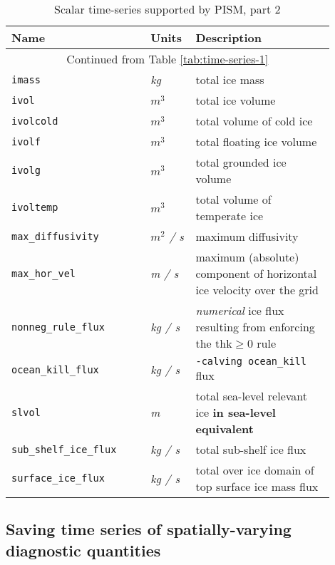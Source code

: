 \begin{table}[ht]
  \centering
 \begin{tabular}{p{0.4\linewidth}p{0.1\linewidth}p{0.4\linewidth}}
    \toprule
    \textbf{Name} & \textbf{Units} & \textbf{Description}\\
    \midrule
    \multicolumn{3}{c}{Continued from Table \ref{tab:time-series-1}}\\
    \texttt{imass} & \textsl{kg} &  total ice mass \\
    \texttt{ivol} & \textsl{$m^{3}$} &  total ice volume \\
    \texttt{ivolcold} & \textsl{$m^{3}$} &  total volume of cold ice \\
    \texttt{ivolf} & \textsl{$m^{3}$} &  total floating ice volume \\
    \texttt{ivolg} & \textsl{$m^{3}$} &  total grounded ice volume \\
    \texttt{ivoltemp} & \textsl{$m^{3}$} &  total volume of temperate ice \\
    \texttt{max_diffusivity} & \textsl{$m^{2}$  / s} &  maximum diffusivity \\
    \texttt{max_hor_vel} & \textsl{m  / s} &  maximum (absolute) component of horizontal ice velocity over the grid \\
    \texttt{nonneg_rule_flux} & \textsl{kg  / s} &  \emph{numerical} ice flux resulting from enforcing the $\mathrm{thk} \ge 0$ rule \\
    \texttt{ocean_kill_flux} & \textsl{kg  / s} &  \texttt{-calving ocean_kill} flux \\
    \texttt{slvol} & \textsl{m} &  total sea-level relevant ice \textbf{in sea-level equivalent} \\
    \texttt{sub_shelf_ice_flux} & \textsl{kg  / s} &  total sub-shelf ice flux \\
    \texttt{surface_ice_flux} & \textsl{kg  / s} &  total over ice domain of top surface ice mass flux \\
    \bottomrule
  \end{tabular}
\caption{Scalar time-series supported by PISM, part 2}
\label{tab:time-series-2}
\end{table}


\subsection{Saving time series of spatially-varying diagnostic quantities}
\label{sec:saving-spat-vari}

